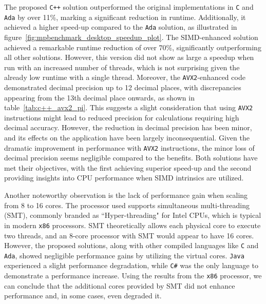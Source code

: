 
The proposed \texttt{C++} solution outperformed the original implementations in \texttt{C} and \texttt{Ada} by over 11\%, marking a significant reduction in runtime. Additionally, it achieved a higher speed-up compared to the \texttt{Ada} solution, as illustrated in figure~\ref{fig:mpbenchmark_desktop_speedup_plot}. The SIMD-enhanced solution achieved a remarkable runtime reduction of over 70\%, significantly outperforming all other solutions. However, this version did not show as large a speedup when run with an increased number of threads, which is not surprising given the already low runtime with a single thread. Moreover, the \texttt{AVX2}-enhanced code demonstrated decimal precision up to 12 decimal places, with discrepancies appearing from the 13th decimal place onwards, as shown in table~\ref{tab:c++_avx2_pi}. This suggests a slight consideration that using \texttt{AVX2} instructions might lead to reduced precision for calculations requiring high decimal accuracy. However, the reduction in decimal precision has been minor, and its effects on the application have been largely inconsequential. Given the dramatic improvement in performance with \texttt{AVX2} instructions, the minor loss of decimal precision seems negligible compared to the benefits. Both solutions have met their objectives, with the first achieving superior speed-up and the second providing insights into CPU performance when SIMD intrinsics are utilized.

Another noteworthy observation is the lack of performance gain when scaling from 8 to 16 cores. The processor used supports simultaneous multi-threading (SMT), commonly branded as ``Hyper-threading" for Intel CPUs, which is typical in modern \texttt{x86} processors. SMT theoretically allows each physical core to execute two threads, and an 8-core processor with SMT would appear to have 16 cores. However, the proposed solutions, along with other compiled languages like \texttt{C} and \texttt{Ada}, showed negligible performance gains by utilizing the virtual cores. \texttt{Java} experienced a slight performance degradation, while \texttt{C\#} was the only language to demonstrate a performance increase. Using the results from the \texttt{x86} processor, we can conclude that the additional cores provided by SMT did not enhance performance and, in some cases, even degraded it.

